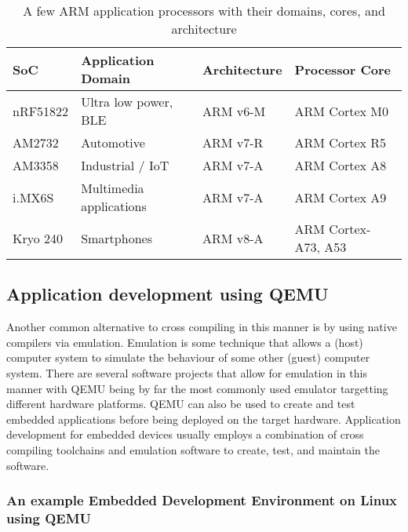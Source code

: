 \begin{table}[h]
	\centering
	\begin{tabular}{ |p{5em}|p{10em}|p{7em}|p{10em}| }
		\hline
			\textbf{SoC} &
			\textbf{Application Domain} &
			\textbf{Architecture} &
			\textbf{Processor Core} \\
		\hline
			nRF51822 &
			Ultra low power, BLE &
			ARM v6-M &
			ARM Cortex M0 \\
		\hline
			AM2732 &
			Automotive &
			ARM v7-R &
			ARM Cortex R5 \\
		\hline
			AM3358 &
			Industrial / IoT &
			ARM v7-A &
			ARM Cortex A8 \\
		\hline
			i.MX6S &
			Multimedia applications &
			ARM v7-A &
			ARM Cortex A9 \\
		\hline
			Kryo 240 &
			Smartphones &
			ARM v8-A &
			ARM Cortex-A73, A53 \\
		\hline
	\end{tabular}
	\caption{A few ARM application processors with their domains, cores, and architecture}
	\label{table:arm}
\end{table}

\subsection{Application development using QEMU}

Another common alternative to cross compiling in this manner is by using native compilers via emulation. Emulation is some technique that allows a (host) computer system to simulate the behaviour of some other (guest) computer system. There are several software projects that allow for emulation in this manner with QEMU being by far the most commonly used emulator targetting different hardware platforms. QEMU can also be used to create and test embedded applications before being deployed on the target hardware. Application development for embedded devices usually employs a combination of cross compiling toolchains and emulation software to create, test, and maintain the software.

\subsubsection{An example Embedded Development Environment on Linux using QEMU}


